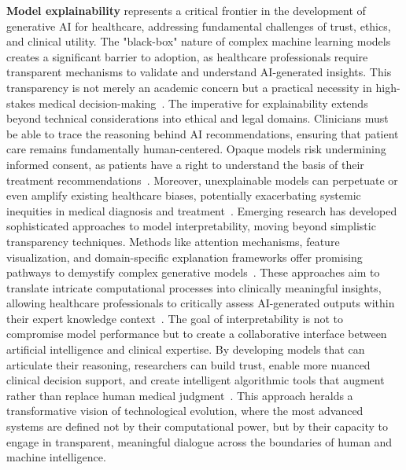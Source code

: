 \textbf{Model explainability} represents a critical frontier in the development of generative AI for healthcare, addressing fundamental challenges of trust, ethics, and clinical utility. The "black-box" nature of complex machine learning models creates a significant barrier to adoption, as healthcare professionals require transparent mechanisms to validate and understand AI-generated insights. This transparency is not merely an academic concern but a practical necessity in high-stakes medical decision-making~\cite{doshi2017towards}. The imperative for explainability extends beyond technical considerations into ethical and legal domains. Clinicians must be able to trace the reasoning behind AI recommendations, ensuring that patient care remains fundamentally human-centered. Opaque models risk undermining informed consent, as patients have a right to understand the basis of their treatment recommendations~\cite{guidotti2018survey}. Moreover, unexplainable models can perpetuate or even amplify existing healthcare biases, potentially exacerbating systemic inequities in medical diagnosis and treatment~\cite{obermeyer2019dissecting}. Emerging research has developed sophisticated approaches to model interpretability, moving beyond simplistic transparency techniques. Methods like attention mechanisms, feature visualization, and domain-specific explanation frameworks offer promising pathways to demystify complex generative models~\cite{selvaraju2017grad}. These approaches aim to translate intricate computational processes into clinically meaningful insights, allowing healthcare professionals to critically assess AI-generated outputs within their expert knowledge context~\cite{rudin2019stop}. The goal of interpretability is not to compromise model performance but to create a collaborative interface between artificial intelligence and clinical expertise. By developing models that can articulate their reasoning, researchers can build trust, enable more nuanced clinical decision support, and create intelligent algorithmic tools that augment rather than replace human medical judgment~\cite{caruana2015intelligible}. This approach heralds a transformative vision of technological evolution, where the most advanced systems are defined not by their computational power, but by their capacity to engage in transparent, meaningful dialogue across the boundaries of human and machine intelligence.


